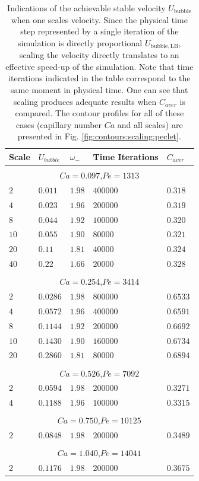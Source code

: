 \documentclass[preprint,12pt]{elsarticle}
\newcommand{\ububble}{U_{\mathrm{bubble}}}
\newcommand{\omegaminus}{\omega_{-}}
\begin{document}
\begin{table}[htb!]
\begin{tabularx}{\textwidth}{|X|X|X|X|X|}
\hline
Scale&$U_{bubble}$&$\omegaminus$&Time Iterations&$C_{aver}$\\
\hline
\multicolumn{5}{c}{}\\
\multicolumn{5}{c}{$Ca=0.097$,$Pe=1313$}\\
\hline
$2$ &$0.011$&$1.98$&$400000$&$0.318$\\
$4$ &$0.023$&$1.96$&$200000$&$0.319$\\
$8$ &$0.044$&$1.92$&$100000$&$0.320$\\
$10$&$0.055$&$1.90$&$80000$ &$0.321$\\
$20$&$0.11 $&$1.81$&$40000$ &$0.324$\\
$40$&$0.22 $&$1.66$&$20000$ &$0.328$\\
\hline
\multicolumn{5}{c}{}\\
\multicolumn{5}{c}{$Ca=0.254$,$Pe=3414$}\\
\hline
$2$& $0.0286$&$1.98$&$800000$&$0.6533$\\
$4$& $0.0572$&$1.96$&$400000$&$0.6591$\\
$8$& $0.1144$&$1.92$&$200000$&$0.6692$\\
$10$&$0.1430$&$1.90$&$160000$&$0.6734$\\
$20$&$0.2860$&$1.81$&$80000$ &$0.6894$\\
\hline
\multicolumn{5}{c}{}\\
\multicolumn{5}{c}{$Ca=0.526$,$Pe=7092$}\\
\hline
$2$&$0.0594$&$1.98$&$200000$&$0.3271$\\
$4$&$0.1188$&$1.96$&$100000$&$0.3315$\\
\hline
\multicolumn{5}{c}{}\\
\multicolumn{5}{c}{$Ca=0.750$,$Pe=10125$}\\
\hline
$2$&$0.0848$&$1.98$&$200000$&$0.3489$\\
\hline
\multicolumn{5}{c}{}\\
\multicolumn{5}{c}{$Ca=1.040$,$Pe=14041$}\\
\hline
$2$&$0.1176$&$1.98$&$200000$&$0.3675$\\
\hline
\end{tabularx}
\caption{Indications of the achievable stable velocity $\ububble$ when one scales velocity. Since
the physical time step represented by a single iteration of the simulation is directly proportional
$U_{\mathrm{bubble,LB}}$, scaling the velocity directly translates to an effective speed-up of the simulation.
Note that time iterations
indicated in the table correspond to the same moment in physical time. One can see that
scaling produces adequate results when $C_{aver}$ is compared.  
The contour
profiles for all of these cases (capillary number $Ca$ and all scales) are presented in Fig.
\ref{fig:contours:scaling:peclet}.
\label{table:scaling:peclet}}
\end{table}
\end{document}

